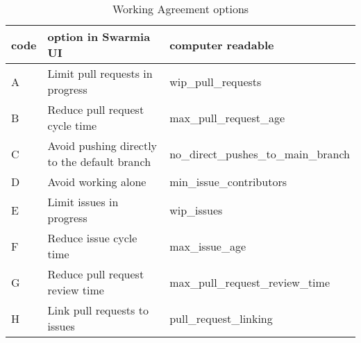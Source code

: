\begin{table}[ht]
\centering
\begin{tabularx}{\textwidth}{ |l|X|l| }
\hline
code & option in Swarmia UI & computer readable \\ [0.5ex] 
\hline\hline
A & Limit pull requests in progress & wip\_pull\_requests \\
B & Reduce pull request cycle time & max\_pull\_request\_age \\
C & Avoid pushing directly to the default branch & no\_direct\_pushes\_to\_main\_branch \\
D & Avoid working alone & min\_issue\_contributors  \\
E & Limit issues in progress & wip\_issues  \\
F & Reduce issue cycle time & max\_issue\_age  \\
G & Reduce pull request review time & max\_pull\_request\_review\_time  \\
H & Link pull requests to issues & pull\_request\_linking  \\
\hline
\end{tabularx}
\caption{Working Agreement options}
\label{tab:workingAgreements}
\end{table}



